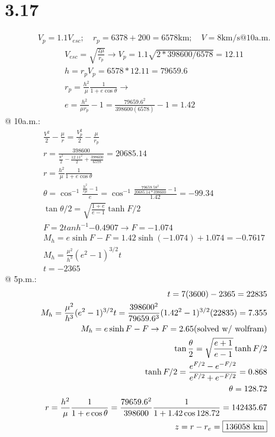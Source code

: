 \documentclass[12 pt]{article}
\begin{document}
\section*{3.17}
\begin{align*}
    V_p=1.1V_{esc};\quad r_p=6378+200=6578\textrm{km};\quad V=8\textrm{km/s}@10\textrm{a.m.}
\end{align*}
\begin{align*}
    V_{esc}=\sqrt{\frac{2\mu}{r_p}}\rightarrow V_p=1.1\sqrt{2*398600/6578}=12.11 \\
    h=r_pV_p=6578*12.11=79659.6 \\
    r_p=\frac{h^2}{\mu}\frac{1}{1+e\cos{\theta}} \rightarrow \\
    e=\frac{h^2}{\mu r_p}-1=\frac{79659.6^2}{398600(6578)}-1=1.42
\end{align*}
@ 10a.m.:
\begin{align*}
    \frac{V^2}{2}-\frac{\mu}{r}=\frac{V_p^2}{2}-\frac{\mu}{r_p} \\
    r=\frac{398600}{\frac{8^2}{2}-\frac{12.11^2}{2}+\frac{398600}{6578}}=20685.14 \\
    r=\frac{h^2}{\mu}\frac{1}{1+e\cos{\theta}} \\
    \theta=\cos^{-1}{\frac{\frac{h^2}{r\mu}-1}{e}}=\cos^{-1}{\frac{\frac{79659.58^2}{20685.14*398600}-1}{1.42}}=-99.34 \\
    \tan{\theta/2}=\sqrt{\frac{1+e}{e-1}}\tanh{F/2} \\
    F=2tanh^{-1}{-0.4907} \rightarrow F=-1.074 \\
    M_h=e\sinh{F}-F=1.42\sinh(-1.074)+1.074=-0.7617 \\
    M_h=\frac{\mu^2}{h^3}(e^2-1)^{3/2}t \\
    t=-2365
\end{align*}
@ 5p.m.:
\begin{align*}
    t=7(3600)-2365=22835 \\
    M_h=\frac{\mu^2}{h^3}(e^2-1)^{3/2}t=\frac{398600^2}{79659.6^3}(1.42^2-1)^{3/2}(22835)=7.355 \\
    M_h=e\sinh{F}-F \rightarrow F=2.65 \textrm{(solved w/ wolfram)} \\
    \tan{\frac{\theta}{2}}=\sqrt{\frac{e+1}{e-1}}\tanh{F/2} \\
    \tanh{F/2}=\frac{e^{F/2}-e^{-F/2}}{e^{F/2}+e^{-F/2}}=0.868 \\
    \theta=128.72 \\
    r=\frac{h^2}{\mu}\frac{1}{1+e\cos{\theta}}=\frac{79659.6^2}{398600}\frac{1}{1+1.42\cos{128.72}}=142435.67 \\
    z = r-r_e=\fbox{$136058$ km}
\end{align*}
\end{document}
